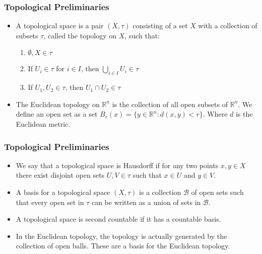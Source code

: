 \documentclass{beamer}
\begin{document}
\begin{frame}%

\frametitle{Topological Preliminaries}

\begin{itemize}

\item A topological space is a pair $(X,\tau)$ consisting of a set $X$ with a collection of subsets
  $\tau$, called the topology on $X$, such that:

\begin{enumerate}

\item $\emptyset, X \in \tau$

\item If $U_i \in \tau$ for $i \in I$, then $\bigcup_{i \in I} U_i \in \tau$

\item If $U_1, U_2 \in \tau$, then $U_1 \cap U_2 \in \tau$

\end{enumerate}

\item The Euclidean topology on $\mathbb{R}^n$ is the collection of all open subsets of
  $\mathbb{R}^n$. We define an open set as a set $B_r(x) = \{y \in \mathbb{R}^n : d(x,y) <r \} $.
  Where $d$ is the Euclidean metric. 


\end{itemize}


\end{frame}
\begin{frame}%

\frametitle{Topological Preliminaries}

\begin{itemize}

\item We say that a topological space is Hausdorff if for any two points $x,y \in X$ there exist
  disjoint open sets $U,V \in \tau$ such that $x \in U$ and $y \in V$.

\pause

\item A basis for a topological space $(X,\tau)$ is a collection $\mathcal{B}$ of open
  sets such that every open set in $\tau$ can be written as a union of sets in $\mathcal{B}$. 

\item A topological space is second countable if it has a countable basis.

\pause

\item In the Euclidean topology, the topology is actually generated by the collection of open balls.
These are a basis for the Euclidean topology.

\end{itemize}

\end{frame}
\end{document}
